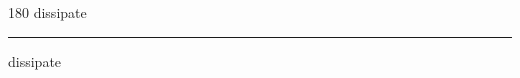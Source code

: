 
\begin{frame}
\begin{center}
\begin{turn}{180}
{\fontsize{2.5cm}{1em}\selectfont dissipate}
\end{turn}
\vspace{1em}\par  
\hrule
\vspace{1em}\par  
{\fontsize{2.5cm}{1em}\selectfont dissipate}
\end{center}
\end{frame}
